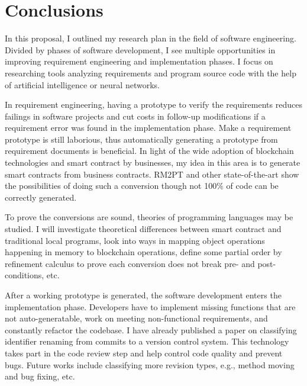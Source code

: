 \chapter{Conclusions}

In this proposal, I outlined my research plan in the field of software engineering.
Divided by phases of software development, I see multiple opportunities in improving requirement engineering and implementation phases.
I focus on researching tools analyzing requirements and program source code with the help of artificial intelligence or neural networks.

In requirement engineering, having a prototype to verify the requirements reduces failings in software projects and cut costs in follow-up modifications if a requirement error was found in the implementation phase. Make a requirement prototype is still laborious, thus automatically generating a prototype from requirement documents is beneficial.
In light of the wide adoption of blockchain technologies and smart contract by businesses, my idea in this area is to generate smart contracts from business contracts.
RM2PT and other state-of-the-art show the possibilities of doing such a conversion though not 100\% of code can be correctly generated.

To prove the conversions are sound, theories of programming languages may be studied. I will investigate theoretical differences between smart contract and traditional local programs,
look into ways in mapping object operations happening in memory to blockchain operations, define some partial order by refinement calculus to prove each conversion does not break pre- and post-conditions, etc.

After a working prototype is generated, the software development enters the implementation phase. Developers have to implement missing functions that are not auto-generatable, work on meeting non-functional requirements, and constantly refactor the codebase.
I have already published a paper on classifying identifier renaming from commits to a version control system.
This technology takes part in the code review step and help control code quality and prevent bugs.
Future works include classifying more revision types, e.g., method moving and bug fixing, etc.




